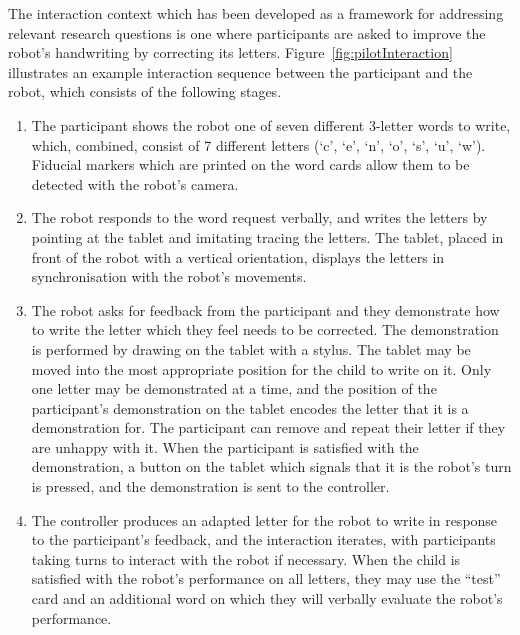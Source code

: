 \documentclass{sig-alternate}
\begin{document}
The interaction context which has been developed as a framework for addressing
relevant research questions is one where participants are asked to improve the robot's
handwriting by correcting its letters. Figure~\ref{fig:pilotInteraction}
illustrates an example interaction sequence between the participant and the
robot, which consists of the following stages.

\begin{enumerate}

    \item The participant shows the robot one of seven different 3-letter words
        to write, which, combined, consist of 7 different letters (`c', `e',
        `n', `o', `s', `u', `w'). Fiducial markers which are printed on the word
        cards allow them to be detected with the robot's camera. 

    \item The robot responds to the word request verbally, and writes the
        letters by pointing at the tablet and imitating tracing the letters. The
        tablet, placed in front of the robot with a vertical orientation,
        displays the letters in synchronisation with the robot's movements. 

    \item The robot asks for feedback from the participant and they demonstrate
        how to write the letter which they feel needs to be corrected. The
        demonstration is performed by drawing on the tablet with a stylus. The
        tablet may be moved into the most appropriate position for the child to
        write on it. Only one letter may be demonstrated at a time, and the
        position of the participant's demonstration on the tablet encodes the
        letter that it is a demonstration for. The participant can remove and
        repeat their letter if they are unhappy with it.
        When the participant is satisfied with the demonstration, a button on
        the tablet which signals that it is the robot's turn is pressed, and the
        demonstration is sent to the controller.

    \item The controller produces an adapted letter for the robot to write in
        response to the participant's feedback, and the interaction iterates,
        with participants taking turns to interact with the robot if necessary.
        When the child is satisfied with the robot's performance on all letters,
        they may use the ``test'' card and an additional word on which they will
        verbally evaluate the robot's performance. 

\end{enumerate}
\end{document}
